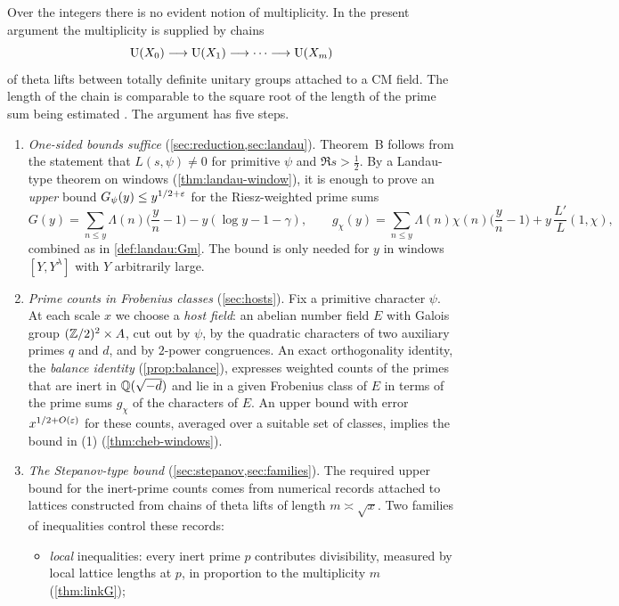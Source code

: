 Over the integers there is no evident notion of multiplicity. In the present argument the
multiplicity is supplied by chains
\[
\operatorname{U}(X_0)\longrightarrow\operatorname{U}(X_1)\longrightarrow\cdots\longrightarrow\operatorname{U}(X_m)
\]
of theta lifts between totally definite unitary groups attached to a CM field. The length of the
chain is comparable to the square root of the length of the prime sum being estimated
\cite{Announcement2026}. The argument has five steps.

\begin{enumerate}[label=(\arabic*)]
\item \emph{One-sided bounds suffice} (\cref{sec:reduction,sec:landau}). Theorem~B follows from the
statement that $L(s,\psi)\ne0$ for primitive $\psi$ and $\Re s>\frac12$. By a Landau-type theorem on
windows (\cref{thm:landau-window}), it is enough to prove an \emph{upper} bound
$G_\psi(y)\le y^{1/2+\varepsilon}$ for the Riesz-weighted prime sums
\[
G(y)=\sum_{n\le y}\Lambda(n)\Big(\frac yn-1\Big)-y(\log y-1-\gamma),\qquad
g_\chi(y)=\sum_{n\le y}\Lambda(n)\chi(n)\Big(\frac yn-1\Big)+y\,\frac{L'}{L}(1,\chi),
\]
combined as in \cref{def:landau:Gm}. The bound is only needed for $y$ in windows $[Y,Y^\lambda]$
with $Y$ arbitrarily large.
\item \emph{Prime counts in Frobenius classes} (\cref{sec:hosts}). Fix a primitive character $\psi$.
At each scale $x$ we choose a \emph{host field}: an abelian number field $E$ with Galois group
$(\mathbb{Z}/2)^2\times A$, cut out by $\psi$, by the quadratic characters of two auxiliary primes $q$ and
$d$, and by $2$-power congruences. An exact orthogonality identity, the \emph{balance identity}
(\cref{prop:balance}), expresses weighted counts of the primes that are inert in $\mathbb{Q}(\sqrt{-d})$ and
lie in a given Frobenius class of $E$ in terms of the prime sums $g_\chi$ of the characters of $E$.
An upper bound with error $x^{1/2+O(\varepsilon)}$ for these counts, averaged over a suitable set of
classes, implies the bound in (1) (\cref{thm:cheb-windows}).
\item \emph{The Stepanov-type bound} (\cref{sec:stepanov,sec:families}). The required upper bound
for the inert-prime counts comes from numerical records attached to lattices constructed from chains
of theta lifts of length $m\asymp\sqrt x$. Two families of inequalities control these records:
  \begin{itemize}
  \item \emph{local} inequalities: every inert prime $p$ contributes divisibility, measured by local
  lattice lengths at $p$, in proportion to the multiplicity $m$ (\cref{thm:linkG});

\end{itemize}
\end{enumerate}
